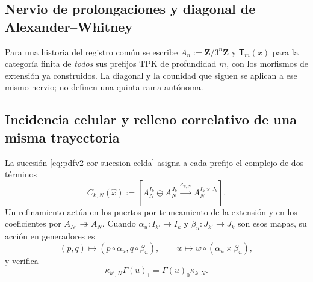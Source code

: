 \subsection{Nervio de prolongaciones y diagonal de Alexander--Whitney}
Para una historia del registro común se escribe
\(A_n:=\mathbf Z/3^n\mathbf Z\) y \(\mathsf T_m(x)\) para la categoría
finita de \emph{todos} sus prefijos TPK de profundidad \(m\), con los
morfismos de extensión ya construidos. La diagonal y la counidad que siguen
se aplican a ese mismo nervio; no definen una quinta rama autónoma.
\begingroup
  \let\section\subsection
  
\endgroup

\section{Incidencia celular y relleno correlativo de una misma trayectoria}

La sucesión \eqref{eq:pdfv2-cor-sucesion-celda} asigna a cada prefijo el
complejo de dos términos
\begin{equation}
\label{eq:pdfv2-cor-cono-celda}
 C_{k,N}(\widehat x):=
 \left[A_N^{I_k}\oplus A_N^{J_k}
 \xrightarrow{\kappa_{k,N}}A_N^{I_k\times J_k}\right].
\end{equation}
Un refinamiento actúa en los puertos por truncamiento de la extensión y en
los coeficientes por \(A_{N'}\twoheadrightarrow A_N\). Cuando
\(\alpha_u:I_{k'}\to I_k\) y \(\beta_u:J_{k'}\to J_k\) son esos mapas, su
acción en generadores es
\begin{equation}
\label{eq:pdfv2-cor-refinamiento-celda}
 (p,q)\longmapsto(p\circ\alpha_u,q\circ\beta_u),
 \qquad
 w\longmapsto w\circ(\alpha_u\times\beta_u),
\end{equation}
y verifica
\begin{equation}
\label{eq:pdfv2-cor-refinamiento-cadena}
 \kappa_{k',N}\Gamma(u)_1=\Gamma(u)_0\kappa_{k,N}.
\end{equation}

